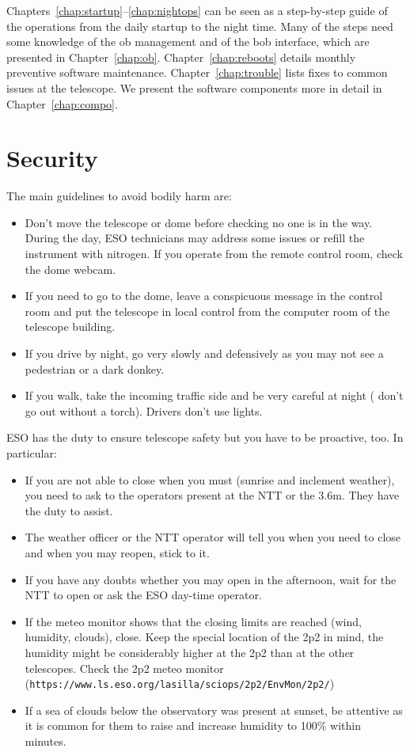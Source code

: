 \documentclass[11pt,fleqn,a4paper]{book}
\begin{document}
Chapters~\ref{chap:startup}--\ref{chap:nightops} can be seen as a step-by-step
guide of the operations from the daily startup to the night time. Many of the
steps need some knowledge of the \gls{ob} management and of the \gls{bob}
interface, which are presented in Chapter~\ref{chap:ob}.
Chapter~\ref{chap:reboots} details monthly preventive software maintenance.
Chapter~\ref{chap:trouble} lists fixes to common issues at the telescope.  We
present the software components more in detail in Chapter~\ref{chap:compo}.

\newpage
\section{Security}

The main guidelines to avoid bodily harm are:
\begin{itemize}
\item Don't move the telescope or \gls{dome} before checking no one is in the way.  During the day, ESO technicians may address some issues or refill the instrument with nitrogen.  If you operate from the remote \gls{control room}, check the dome \gls{webcam}.
\item If you need to go to the \gls{dome}, leave a conspicuous message in the \gls{control room} and put the telescope in local control from the \gls{computer room} of the telescope building.
\item If you drive by night, go very slowly and defensively as you may not see a pedestrian or a dark donkey.  
\item If you walk, take the incoming traffic side and be very careful at night ( don't go out without a torch). Drivers don't use lights.
\end{itemize}

ESO has the duty to ensure telescope safety but you have to be proactive, too.  In particular:
\begin{itemize}
\item If you are not able to close when you must (sunrise and inclement weather), you need to ask to the operators present at the NTT or the 3.6m. They have the duty to assist.  
\item The weather officer or the NTT operator will tell you when you need to close and when you may reopen, stick to it.
\item If you have any doubts whether you may open in the afternoon, wait for the NTT to open or ask the ESO day-time operator.
\item If the meteo monitor shows that the closing limits are reached (wind, humidity, clouds), close. Keep the special location of the 2p2 in mind, the humidity might be considerably higher at the 2p2 than at the other telescopes. Check the 2p2 meteo monitor\\ (\texttt{https://www.ls.eso.org/lasilla/sciops/2p2/EnvMon/2p2/})
\item If a sea of clouds below the observatory was present at sunset, be attentive as it is common for them to raise and increase humidity to 100\% within minutes.
\end{itemize}
\end{document}
